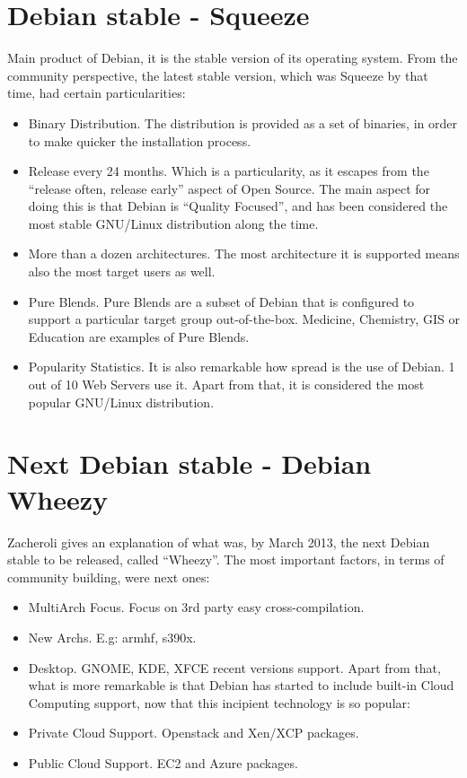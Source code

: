 \documentclass[11pt]{article}
\begin{document}
\section{Debian stable - Squeeze}
Main product of Debian, it is the stable version of its operating system. From the community perspective, the latest stable version, which was Squeeze by that time, had certain particularities:
\begin{itemize}\itemsep0pt
\item{Binary Distribution}. The distribution is provided as a set of binaries, in order to make quicker the installation process.
\item{Release every 24 months}. Which is a particularity, as it escapes from the ``release often, release early'' aspect of Open Source. The main aspect for doing this is that Debian is ``Quality Focused'', and has been considered the most stable GNU/Linux distribution along the time.
\item{More than a dozen architectures}. The most architecture it is supported means also the most target users as well.
\item{Pure Blends}. Pure Blends are a subset of Debian that is configured to support a particular target group out-of-the-box. Medicine, Chemistry, GIS or Education are examples of Pure Blends.
\item{Popularity Statistics}. It is also remarkable how spread is the use of Debian. 1 out of 10 Web Servers use it. Apart from that, it is considered the most popular GNU/Linux distribution.
\end{itemize}

\section{Next Debian stable - Debian Wheezy}
Zacheroli gives an explanation of what was, by March 2013, the next Debian stable to be released, called ``Wheezy''. The most important factors, in terms of community building, were next ones:
\begin{itemize}\itemsep0pt
\item{MultiArch Focus}. Focus on 3rd party easy cross-compilation.
\item{New Archs}. E.g: armhf, s390x.
\item{Desktop}. GNOME, KDE, XFCE recent versions support.
Apart from that, what is more remarkable is that Debian has started to include built-in Cloud Computing support, now that this incipient technology is so popular:
\item{Private Cloud Support}. Openstack and Xen/XCP packages.
\item{Public Cloud Support}. EC2 and Azure packages.
\end{itemize}
\end{document}
